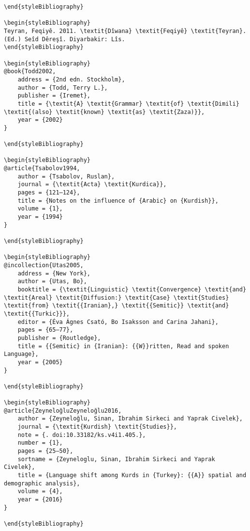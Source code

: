 \documentclass[output=paper]{langsci/langscibook}
\begin{document}
\begin{verbatim}
\end{styleBibliography}

\begin{styleBibliography}
Teyran, Feqiyê. 2011. \textit{Dîwana} \textit{Feqiyê} \textit{Teyran}. (Ed.) Seîd Dêreşî. Diyarbakir: Lîs.
\end{styleBibliography}

\begin{styleBibliography}
@book{Todd2002,
	address = {2nd edn. Stockholm},
	author = {Todd, Terry L.},
	publisher = {Iremet},
	title = {\textit{A} \textit{Grammar} \textit{of} \textit{Dimili} \textit{(also} \textit{known} \textit{as} \textit{Zaza)}},
	year = {2002}
}

\end{styleBibliography}

\begin{styleBibliography}
@article{Tsabolov1994,
	author = {Tsabolov, Ruslan},
	journal = {\textit{Acta} \textit{Kurdica}},
	pages = {121–124},
	title = {Notes on the influence of {Arabic} on {Kurdish}},
	volume = {1},
	year = {1994}
}

\end{styleBibliography}

\begin{styleBibliography}
@incollection{Utas2005,
	address = {New York},
	author = {Utas, Bo},
	booktitle = {\textit{Linguistic} \textit{Convergence} \textit{and} \textit{Areal} \textit{Diffusion:} \textit{Case} \textit{Studies} \textit{from} \textit{{Iranian},} \textit{{Semitic}} \textit{and} \textit{{Turkic}}},
	editor = {Éva Ágnes Csató, Bo Isaksson and Carina Jahani},
	pages = {65–77},
	publisher = {Routledge},
	title = {{Semitic} in {Iranian}: {{W}}ritten, Read and spoken Language},
	year = {2005}
}

\end{styleBibliography}

\begin{styleBibliography}
@article{ZeyneloğluZeyneloğlu2016,
	author = {Zeyneloğlu, Sinan, Ibrahim Sirkeci and Yaprak Civelek},
	journal = {\textit{Kurdish} \textit{Studies}},
	note = {. doi:10.33182/ks.v4i1.405.},
	number = {1},
	pages = {25–50},
	sortname = {Zeyneloglu, Sinan, Ibrahim Sirkeci and Yaprak Civelek},
	title = {Language shift among Kurds in {Turkey}: {{A}} spatial and demographic analysis},
	volume = {4},
	year = {2016}
}

\end{styleBibliography}
\end{verbatim} 

{\sloppy\printbibliography[heading=subbibliography,notkeyword=this]}
\end{document}
